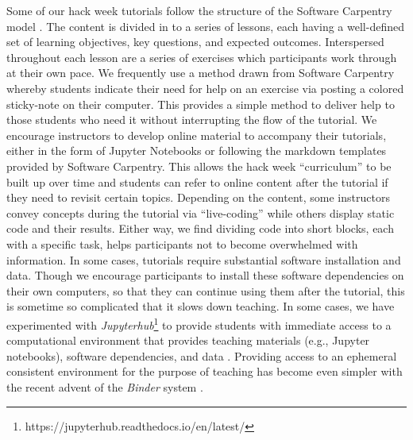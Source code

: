 \documentclass{aastex62}
\begin{document}
Some of our hack week tutorials follow the structure of the Software Carpentry model \citep{b:wilson-swc-lessons-2016}. The content is divided in to a series of lessons, each having a well-defined set of learning objectives, key questions, and expected outcomes. Interspersed throughout each lesson are a series of exercises which participants work through at their own pace. We frequently use a method drawn from Software Carpentry whereby students indicate their need for help on an exercise via posting a colored sticky-note on their computer. This provides a simple method to deliver help to those students who need it without interrupting the flow of the tutorial. We encourage instructors to develop online material to accompany their tutorials, either in the form of Jupyter Notebooks \citep{kluyver2016jupyter} or following the markdown templates provided by Software Carpentry. This allows the hack week ``curriculum'' to be built up over time and students can refer to online content after the tutorial if they need to revisit certain topics. Depending on the content, some instructors convey concepts during the tutorial via ``live-coding'' while others display static code and their results. Either way, we find dividing code into short blocks, each with a specific task, helps participants not to become overwhelmed with information.
In some cases, tutorials require substantial software installation and data. Though we encourage participants to install these software dependencies on their own computers, so that they can continue using them after the tutorial, this is sometime so complicated that it slows down teaching. In some cases, we have experimented with \emph{Jupyterhub}\footnote{https://jupyterhub.readthedocs.io/en/latest/} to provide students with immediate access to a computational environment that provides teaching materials (e.g., Jupyter notebooks), software dependencies, and data \citep{holdgraf2017portable}. Providing access to an ephemeral consistent environment for the purpose of teaching has become even simpler with the recent advent of the \emph{Binder} system \citep{Holdgraf2017-pd, Titus_Brown_undated-pc}.
\end{document}
